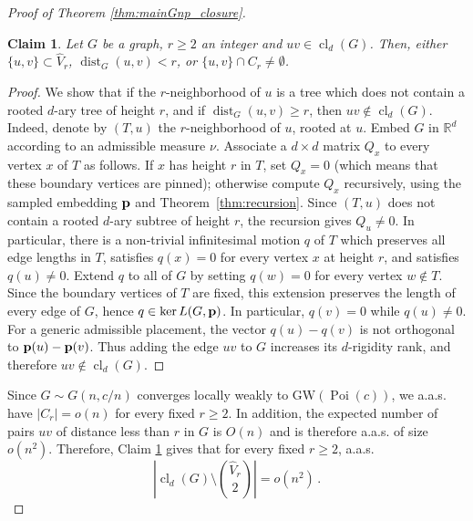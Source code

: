 \documentclass[reqno,english]{amsart}
\numberwithin{equation}{section}
\newtheorem{claim}[theorem]{Claim}
\theoremstyle{definition}{
\newtheorem{example}[theorem]{Example}
\newtheorem{definition}[theorem]{Definition}
\newtheorem*{definition*}{Definition}
\newtheorem{problem}[theorem]{Problem}
\newtheorem{question}[theorem]{Question}
}
\newcommand{\p}{{\bf p}}
\begin{document}
\begin{proof}[Proof of Theorem \ref{thm:mainGnp_closure}]
\begin{claim}\label{clm:deterministic_closure_r}
Let $G$ be a graph, $r\ge 2$ an integer and $uv\in\operatorname{cl}_d(G)$. Then, either
    $\{u,v\}\subset \widehat V_r$,
    $\operatorname{dist}_G(u,v)<r$, or
    $\{u,v\}\cap C_r\ne\emptyset$.
\end{claim}
\begin{proof}
    We show that if the $r$-neighborhood
of $u$ is a tree which does not contain a rooted $d$-ary tree of height
$r$, and if $\operatorname{dist}_G(u,v)\ge r$, then
$uv\notin \operatorname{cl}_d(G)$.
Indeed, denote by $(T,u)$ the $r$-neighborhood of $u$, rooted at $u$.
Embed $G$ in $\mathbb R^d$ according to an admissible measure $\nu$.
Associate a $d\times d$ matrix $Q_x$ to every vertex $x$ of $T$ as
follows. If $x$ has height $r$ in $T$, set $Q_x=0$ (which means that these boundary vertices are pinned); otherwise compute
$Q_x$ recursively, using the sampled embedding $\p$ and
Theorem~\ref{thm:recursion}. Since $(T,u)$ does not contain a rooted
$d$-ary subtree of height $r$, the recursion gives $Q_u\ne 0$.
In particular, there is a non-trivial infinitesimal motion $q$ of $T$
which preserves all edge lengths in $T$, satisfies $q(x)=0$ for every
vertex $x$ at height $r$, and satisfies $q(u)\ne 0$. Extend $q$ to all
of $G$ by setting $q(w)=0$ for every vertex $w\notin T$. Since the boundary
vertices of $T$ are fixed, this extension preserves the length of every
edge of $G$, hence $q\in\ker L(G,\p)$.
In particular, $q(v)=0$ while $q(u)\ne 0$. For a generic admissible
placement, the vector $q(u)-q(v)$ is not orthogonal to
$\p(u)-\p(v)$. Thus adding the edge $uv$ to $G$ increases its $d$-rigidity rank, and therefore $uv\notin \operatorname{cl}_d(G)$.
\end{proof}

Since \(G\sim G(n,c/n)\) converges locally weakly to
\(\mathrm{GW}(\operatorname{Poi}(c))\), we a.a.s. have $|C_r|=o(n)$ for every fixed \(r\ge 2\). 
In addition, the expected number of pairs $uv$ of distance less than $r$ in $G$ is $O(n)$ and is therefore a.a.s. of size $o(n^2)$. Therefore,
    Claim \ref{clm:deterministic_closure_r} gives that for every fixed $r\ge 2$, a.a.s.
    \begin{equation}\label{eq:closure-Vr-upper-bound}
    \left|
    \operatorname{cl}_d(G)\setminus \binom{\widehat V_r}{2}
    \right| =o(n^2)\,.
\end{equation}



\end{proof}
\end{document}
